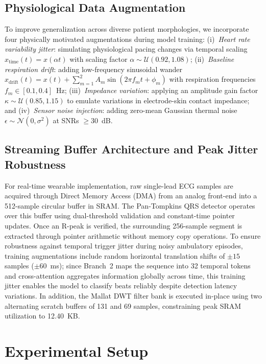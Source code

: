 \documentclass[conference]{IEEEtran}
\begin{document}
\subsection{Physiological Data Augmentation}
To improve generalization across diverse patient morphologies, we incorporate four physically motivated augmentations during model training:
(i)~\emph{Heart rate variability jitter}: simulating physiological pacing changes via temporal scaling $x_{\text{time}}(t) = x(\alpha t)$ with scaling factor $\alpha \sim \mathcal{U}(0.92, 1.08)$;
(ii)~\emph{Baseline respiration drift}: adding low-frequency sinusoidal wander $x_{\text{drift}}(t) = x(t) + \sum_{m=1}^{2} A_m \sin(2\pi f_m t + \phi_m)$ with respiration frequencies $f_m \in [0.1, 0.4]$~Hz;
(iii)~\emph{Impedance variation}: applying an amplitude gain factor $\kappa \sim \mathcal{U}(0.85, 1.15)$ to emulate variations in electrode-skin contact impedance; and
(iv)~\emph{Sensor noise injection}: adding zero-mean Gaussian thermal noise $\epsilon \sim \mathcal{N}(0, \sigma^2)$ at SNRs $\geq 30$~dB.

\subsection{Streaming Buffer Architecture and Peak Jitter Robustness}
For real-time wearable implementation, raw single-lead ECG samples are acquired through Direct Memory Access (DMA) from an analog front-end into a 512-sample circular buffer in SRAM. The Pan-Tompkins QRS detector operates over this buffer using dual-threshold validation and constant-time pointer updates. Once an R-peak is verified, the surrounding 256-sample segment is extracted through pointer arithmetic without memory copy operations. To ensure robustness against temporal trigger jitter during noisy ambulatory episodes, training augmentations include random horizontal translation shifts of $\pm 15$ samples ($\pm 60$~ms); since Branch~2 maps the sequence into 32 temporal tokens and cross-attention aggregates information globally across time, this training jitter enables the model to classify beats reliably despite detection latency variations. In addition, the Mallat DWT filter bank is executed in-place using two alternating scratch buffers of 131 and 69 samples, constraining peak SRAM utilization to 12.40~KB.


\section{Experimental Setup}
\label{sec:exp}
\end{document}
